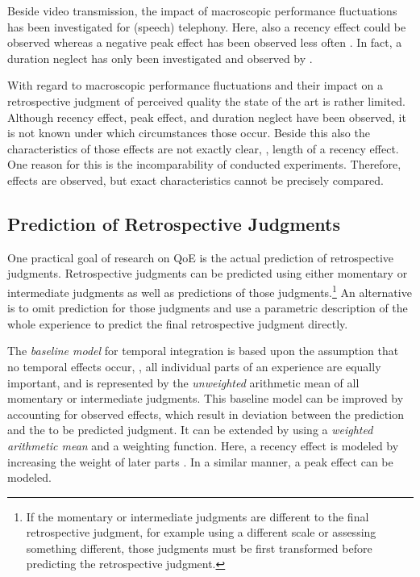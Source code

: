 Beside video transmission, the impact of macroscopic performance fluctuations has been investigated for (speech) telephony. %
Here, also a recency effect could be observed \citep[\eg,][]{rosenbluth_testing_1998, hamberg_time-varying_1999, gros_instantaneous_2001, gros_effects_2004, belmudez_audiovisual_2015, weiss_modeling_2009, lewcio_management_2014} whereas a negative peak effect has been observed less often \citep[\eg,][]{weiss_modeling_2009, belmudez_audiovisual_2015, lewcio_management_2014}.
In fact, a duration neglect has only been investigated and observed by \citet{rosenbluth_testing_1998}.

With regard to macroscopic performance fluctuations and their impact on a retrospective judgment of perceived quality the state of the art is rather limited.
Although recency effect, peak effect, and duration neglect have been observed, it is not known under which circumstances those occur.
Beside this also the characteristics of those effects are not exactly clear, \ie, length of a recency effect.
One reason for this is the incomparability of conducted experiments.
Therefore, effects are observed, but exact characteristics cannot be precisely compared.

\subsection{Prediction of Retrospective Judgments}
One practical goal of research on \ac{QoE} is the actual prediction of retrospective judgments.
Retrospective judgments can be predicted using either momentary or intermediate judgments as well as predictions of those judgments.\footnote{If the momentary or intermediate judgments are different to the final retrospective judgment, for example using a different scale or assessing something different, those judgments must be first transformed before predicting the retrospective judgment.}
An alternative is to omit prediction for those judgments and use a parametric description of the whole experience to predict the final retrospective judgment directly.

The \emph{baseline model} for temporal integration is based upon the assumption that no temporal effects occur, \ie, all individual parts of an experience are equally important, and is represented by the \emph{unweighted} arithmetic mean of all momentary or intermediate judgments.
This baseline model can be improved by accounting for observed effects, which result in deviation between the prediction and the to be predicted judgment.
It can be extended by using a \emph{weighted arithmetic mean} and a weighting function.
Here, a recency effect is modeled by increasing the weight of later parts \citep[][]{rosenbluth_testing_1998, weiss_modeling_2009, hamberg_time-varying_1999}.
In a similar manner, a peak effect can be modeled.


